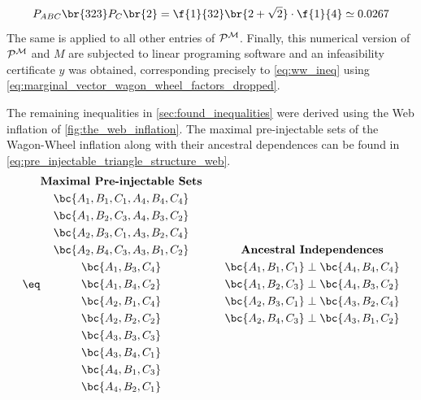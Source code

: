\documentclass[aps, 10pt, english, twoside, pra, nofootinbib, tightenlines, longbibliography, superscriptaddress]{revtex4-1}
\begin{document}
    \[ \prob[ABC]\br{323}\prob[C]\br{2} = \f{1}{32}\br{2 + \sqrt{2}} \cdot \f{1}{4} \simeq 0.0267  \]
    The same is applied to all other entries of $\probvec^{\mscenario}$. Finally, this numerical version of $\probvec^{\mscenario}$ and $M$ are subjected to linear programing software and an infeasibility certificate $y$ was obtained, corresponding precisely to \cref{eq:ww_ineq} using \cref{eq:marginal_vector_wagon_wheel_factors_dropped}.

    The remaining inequalities in \cref{sec:found_inequalities} were derived using the Web inflation of \cref{fig:the_web_inflation}. The maximal pre-injectable sets of the Wagon-Wheel inflation along with their ancestral dependences can be found in \cref{eq:pre_injectable_triangle_structure_web}.
    \begin{equation*}
        \eq \label{eq:pre_injectable_triangle_structure_web}
        \begin{gathered}
            \textbf{Maximal Pre-injectable Sets} \\
            \bc{A_1, B_1, C_1, A_4, B_4, C_4} \\
            \bc{A_1, B_2, C_3, A_4, B_3, C_2} \\
            \bc{A_2, B_3, C_1, A_3, B_2, C_4} \\
            \bc{A_2, B_4, C_3, A_3, B_1, C_2} \\
            \bc{A_1, B_3, C_4} \\
            \bc{A_1, B_4, C_2} \\
            \bc{A_2, B_1, C_4} \\
            \bc{A_2, B_2, C_2} \\
            \bc{A_3, B_3, C_3} \\
            \bc{A_3, B_4, C_1} \\
            \bc{A_4, B_1, C_3} \\
            \bc{A_4, B_2, C_1}
        \end{gathered}
        \qquad
        \begin{gathered}
            \textbf{Ancestral Independences} \\
            \bc{A_1, B_1, C_1} \ancestralindep \bc{A_4, B_4, C_4} \\
            \bc{A_1, B_2, C_3} \ancestralindep \bc{A_4, B_3, C_2} \\
            \bc{A_2, B_3, C_1} \ancestralindep \bc{A_3, B_2, C_4} \\
            \bc{A_2, B_4, C_3} \ancestralindep \bc{A_3, B_1, C_2} \\

\end{gathered}
\end{equation*}
\end{document}
